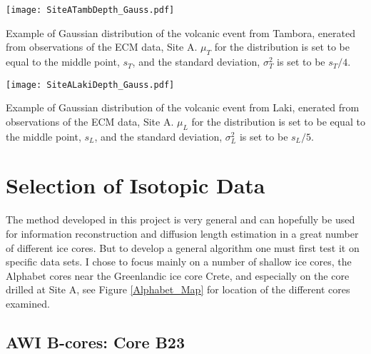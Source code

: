 \documentclass[../../CompleteThesis2/Complete_2ndDraft]{subfiles}
\begin{document}
\begin{marginfigure}
	\centering
	\texttt{[image: SiteATambDepth\_Gauss.pdf]}
	\caption[Corrected Tambora event, Site A.]{\footnotesize Example of Gaussian distribution of the volcanic event from Tambora,  enerated from observations of the ECM data, Site A. $\mu_T$ for the distribution is set to be equal to the middle point, $s_T$, and the standard deviation, $\sigma_T^2$ is set to be $s_T/4$.}
	\label{Fig:DATA_SiteA_TambDepth_Gauss}
\end{marginfigure}


\begin{marginfigure}
	\centering
	\texttt{[image: SiteALakiDepth\_Gauss.pdf]}
	\caption[Corrected Laki event, Site A.]{\footnotesize Example of Gaussian distribution of the volcanic event from Laki,  enerated from observations of the ECM data, Site A. $\mu_L$ for the distribution is set to be equal to the middle point, $s_L$, and the standard deviation, $\sigma_L^2$ is set to be $s_L/5$.}
	\label{Fig:DATA_SiteA_LakiDepth_Gauss}
\end{marginfigure}



\section[Selection][Selection]{Selection of Isotopic Data}
\label{Sec:Data_Selection}


The method developed in this project is very general and can hopefully be used for information reconstruction and diffusion length estimation in a great number of different ice cores. But to develop a general algorithm one must first test it on specific data sets. I chose to focus mainly on a number of shallow ice cores, the Alphabet cores near the Greenlandic ice core Crete, and especially on the core drilled at Site A, see Figure \ref{Alphabet_Map} for location of the different cores examined.

\subsection[AWI B-cores]{AWI B-cores: Core B23}
\label{Subsec:Data_Selection_Bcores}
\end{document}
